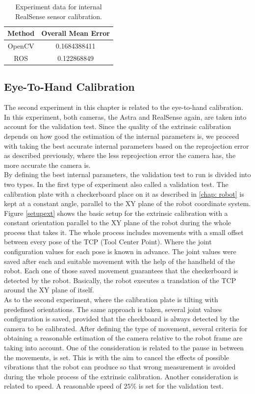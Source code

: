 \begin{table}[ht]
\renewcommand{\arraystretch}{1.3}
\caption{Experiment data for internal RealSense sensor calibration.}
\label{real1}
\centering
\begin{tabular}{|c||c|}
\hline
Method & Overall Mean Error\\
\hline
OpenCV &  0.1684388411\\
\hline
ROS &  0.122868849\\
\hline
\hline
\end{tabular}
\end{table}

\subsection{Eye-To-Hand Calibration}

The second experiment in this chapter is related to the eye-to-hand calibration. In this experiment, both cameras, the Astra and RealSense again, are taken into account for the validation test. Since the quality of the extrinsic calibration depends on how good the estimation of the internal parameters is, we proceed with taking the best accurate internal parameters based on the reprojection error as described previously, where the less reprojection error the camera has, the more accurate the camera is. \\
By defining the best internal parameters, the validation test to run is divided into two types. In the first type of experiment also called a validation test. The calibration plate with a checkerboard place on it as described in \ref{chap: robot} is kept at a constant angle, parallel to the XY plane of the robot coordinate system. Figure \ref{setupext} shows the basic setup for the extrinsic calibration with a constant orientation parallel to the XY plane of the robot during the whole process that takes it. The whole process includes movements with a small offset between every pose of the TCP (Tool Center Point). Where the joint configuration values for each pose is known in advance. The joint values were saved after each and suitable movement with the help of the handheld of the robot. Each one of those saved movement guarantees that the checkerboard is detected by the robot. Basically, the robot executes a translation of the TCP around the XY plane of itself.\\ 
As to the second experiment, where the calibration plate is tilting with predefined orientations. The same approach is taken, several joint values configuration is saved, provided that the checkboard is always detected by the camera to be calibrated. After defining the type of movement, several criteria for obtaining a reasonable estimation of the camera relative to the robot frame are taking into account. One of the consideration is related to the pause in between the movements, is set. This is with the aim to cancel the effects of possible vibrations that the robot can produce so that wrong measurement is avoided during the whole process of the extrinsic calibration. Another consideration is related to speed. A reasonable speed of $25\%$ is set for the validation test. \\

